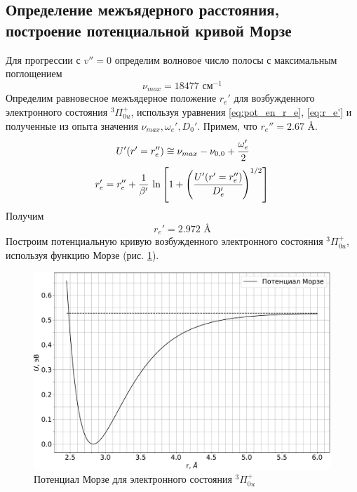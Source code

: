 \subsection{Определение межъядерного расстояния, построение потенциальной кривой Морзе}
Для прогрессии с $v'' = 0$ определим волновое число полосы с максимальным поглощением
\begin{equation}
\nu_{max}  = 18477 \text{ см$^{-1}$}
\end{equation}
Определим равновесное межъядерное положение $r_e'$ для возбужденного электронного состояния $^3\Pi^+_{0u}$, используя уравнения \eqref{eq:pot_en_r_e}, \eqref{eq:r_e'} и полученные из опыта значения $\nu_{max}, \omega_e', D_0'$. Примем, что $r_e'' = 2.67$ \AA.
\begin{equation}
\label{eq:pot_en_r_e}
U'(r'=r_e'') \cong \nu_{max} - \nu_{0,0}+\cfrac{\omega_e'}{2}
\end{equation}
\begin{equation}
\label{eq:r_e'}
r_e'=r_e'' + \frac{1}{\beta'}\,\ln\left[1+\left(\cfrac{U'(r'=r_e'')}{D_e'}\right)^{1/2}\right]
\end{equation}
Получим
\begin{equation}
r_e' = 2.972 \text{ \AA}
\end{equation}
Построим потенциальную кривую возбужденного электронного состояния $^3\Pi^+_{0u}$, используя функцию Морзе (рис. \ref{fig:morse}).
\begin{figure}[h!]
	\centering
	\includegraphics[height=0.45\textheight]{data/morse}
	\caption{Потенциал Морзе для электронного состояния $^3\Pi^+_{0u}$}
	\label{fig:morse}
\end{figure}

